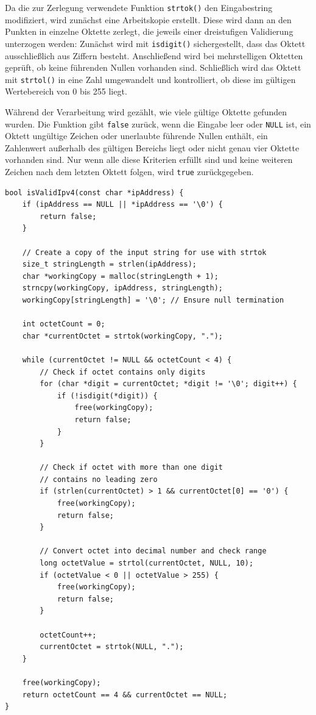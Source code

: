 Da die zur Zerlegung verwendete Funktion \texttt{strtok()} den
Eingabestring modifiziert, wird zunächst eine Arbeitskopie erstellt. Diese wird
dann an den Punkten in einzelne Oktette zerlegt, die jeweils einer dreistufigen
Validierung unterzogen werden: Zunächst wird mit \texttt{isdigit()}
sichergestellt, dass das Oktett ausschließlich aus Ziffern besteht. Anschließend
wird bei mehrstelligen Oktetten geprüft, ob keine führenden Nullen vorhanden
sind. Schließlich wird das Oktett mit \texttt{strtol()} in eine Zahl
umgewandelt und kontrolliert, ob diese im gültigen Wertebereich von 0 bis 255
liegt.

Während der Verarbeitung wird gezählt, wie viele gültige Oktette gefunden
wurden. Die Funktion gibt \texttt{false} zurück, wenn die Eingabe leer
oder \texttt{NULL} ist, ein Oktett ungültige Zeichen oder unerlaubte
führende Nullen enthält, ein Zahlenwert außerhalb des gültigen Bereichs liegt
oder nicht genau vier Oktette vorhanden sind. Nur wenn alle diese Kriterien
erfüllt sind und keine weiteren Zeichen nach dem letzten Oktett folgen, wird
\texttt{true} zurückgegeben.

\begin{verbatim}
bool isValidIpv4(const char *ipAddress) {
    if (ipAddress == NULL || *ipAddress == '\0') {
        return false;
    }

    // Create a copy of the input string for use with strtok
    size_t stringLength = strlen(ipAddress);
    char *workingCopy = malloc(stringLength + 1);
    strncpy(workingCopy, ipAddress, stringLength);
    workingCopy[stringLength] = '\0'; // Ensure null termination

    int octetCount = 0;
    char *currentOctet = strtok(workingCopy, ".");

    while (currentOctet != NULL && octetCount < 4) {
        // Check if octet contains only digits
        for (char *digit = currentOctet; *digit != '\0'; digit++) {
            if (!isdigit(*digit)) {
                free(workingCopy);
                return false;
            }
        }

        // Check if octet with more than one digit
        // contains no leading zero
        if (strlen(currentOctet) > 1 && currentOctet[0] == '0') {
            free(workingCopy);
            return false;
        }

        // Convert octet into decimal number and check range
        long octetValue = strtol(currentOctet, NULL, 10);
        if (octetValue < 0 || octetValue > 255) {
            free(workingCopy);
            return false;
        }

        octetCount++;
        currentOctet = strtok(NULL, ".");
    }

    free(workingCopy);
    return octetCount == 4 && currentOctet == NULL;
}
\end{verbatim}





